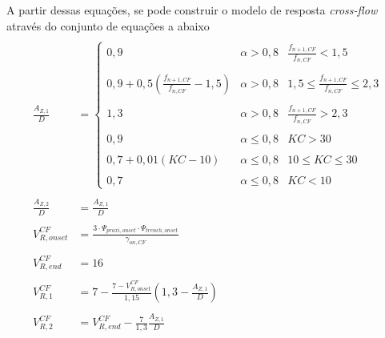 A partir dessas equações, se pode construir o modelo de resposta \textit{cross-flow} através do conjunto de equações a abaixo
\begin{equation}
\label{eq:jdsn-azdj}
\begin{aligned}
\\
\frac{A_{Z,1}}{D} &=
\left\{
\begin{array}{ccc}
0,9                                                      & \alpha > 0,8   &         \frac{f_{n+1,CF}}{f_{n,CF}} <   1,5 \\
\\
0,9 + 0,5 \left(\frac{f_{n+1,CF}}{f_{n,CF}} - 1,5\right) & \alpha > 0,8   & 1,5 \le \frac{f_{n+1,CF}}{f_{n,CF}} \le 2,3 \\
\\
1,3                                                      & \alpha > 0,8   &         \frac{f_{n+1,CF}}{f_{n,CF}} >   2,3 \\
\\
0,9                                                      & \alpha \le 0,8 &        \mathit{KC} >   30 \\
\\
0,7 + 0,01 (\mathit{KC} -10)                             & \alpha \le 0,8 & 10 \le \mathit{KC} \le 30 \\
\\
0,7                                                      & \alpha \le 0,8 &        \mathit{KC} <   10
\end{array}
\right.\\
\\
\frac{A_{Z,2}}{D}                &= \frac{A_{Z,1}}{D}\\
\\
V_{R,\mathit{onset}}^\mathit{CF} &= \frac{3 \cdot \Psi_{\mathit{proxi}, \mathit{onset}} \cdot  \Psi_{\mathit{trench}, \mathit{onset}}}{\gamma_{\mathit{on}, \mathit{CF}}}\\
\\
V_{R,\mathit{end}}^\mathit{CF}   &= 16\\
\\
V_{R, 1}^\mathit{CF}             &= 7 - \frac{7 - V^\mathit{CF}_{R, \mathit{onset}}}{1,15} \left(1,3 - \frac{A_{Z,1}}{D}\right)\\
\\
V_{R, 2}^\mathit{CF}             &= V^\mathit{CF}_{R, \mathit{end}} - \frac{7}{1,3} \frac{A_{Z, 1}}{D}\\
\end{aligned}
\end{equation}

